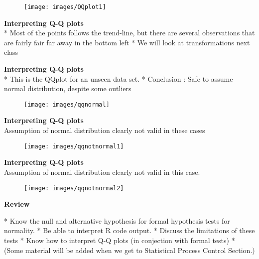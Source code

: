 \begin{figure}
\centering
\texttt{[image: images/QQplot1]}

\end{figure}



\textbf{Interpreting Q-Q plots}\\ 

*  Most of the points follows the trend-line, but there are several observations that are fairly fair far away in the bottom left
*  We will look at transformations next class



\textbf{Interpreting Q-Q plots}\\ 

*  This is the QQplot for an unseen data set.
*  Conclusion : Safe to assume normal distribution, despite some outliers

\begin{figure}
\centering
\texttt{[image: images/qqnormal]}

\end{figure}


\textbf{Interpreting Q-Q plots}\\ Assumption of normal distribution clearly not valid in these cases
\begin{figure}
\centering
\texttt{[image: images/qqnotnormal1]}

\end{figure}



\textbf{Interpreting Q-Q plots}\\ Assumption of normal distribution clearly not valid in this case.
\begin{figure}
\centering
\texttt{[image: images/qqnotnormal2]}

\end{figure}




\textbf{Review}

*  Know the null and alternative hypothesis for formal hypothesis tests for normality.
*  Be able to interpret R code output.
*  Discuss the limitations of these tests
*  Know how to interpret Q-Q plots (in conjection with formal tests)
 *  (Some material will be added when we get to Statistical Process Control Section.)


